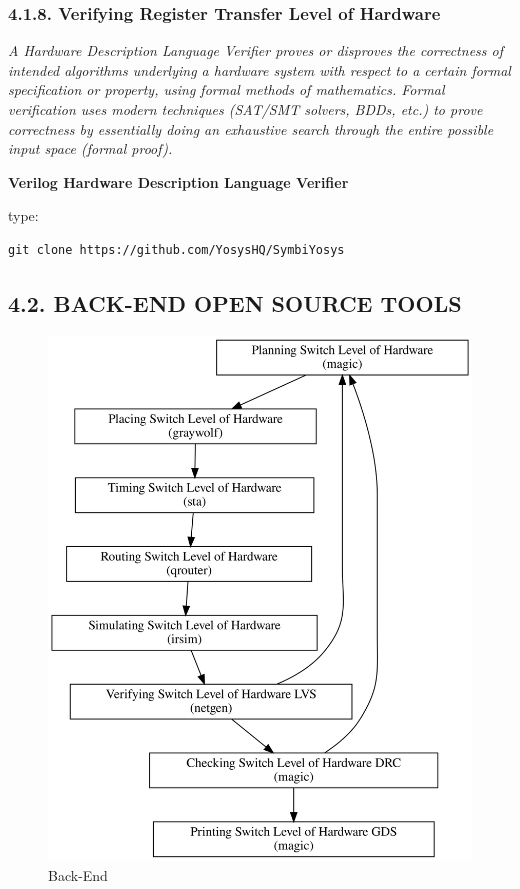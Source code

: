 \documentclass[
]{article}
\begin{document}
\hypertarget{verifying-register-transfer-level-of-hardware}{%
\subsubsection{4.1.8. Verifying Register Transfer Level of
Hardware}\label{verifying-register-transfer-level-of-hardware}}

\emph{A Hardware Description Language Verifier proves or disproves the
correctness of intended algorithms underlying a hardware system with
respect to a certain formal specification or property, using formal
methods of mathematics. Formal verification uses modern techniques
(SAT/SMT solvers, BDDs, etc.) to prove correctness by essentially doing
an exhaustive search through the entire possible input space (formal
proof).}

\textbf{Verilog Hardware Description Language Verifier}

type:

\begin{verbatim}
git clone https://github.com/YosysHQ/SymbiYosys
\end{verbatim}

\hypertarget{back-end-open-source-tools}{%
\subsection{4.2. BACK-END OPEN SOURCE
TOOLS}\label{back-end-open-source-tools}}

\begin{figure}
\centering
\includegraphics{../doc/back-end.svg}
\caption{Back-End}
\end{figure}
\end{document}
